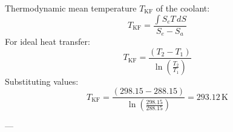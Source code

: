 Thermodynamic mean temperature \( T_{\text{KF}} \) of the coolant:  
\[
T_{\text{KF}} = \frac{\int S_e T \, dS}{S_e - S_a}
\]  
For ideal heat transfer:  
\[
T_{\text{KF}} = \frac{(T_2 - T_1)}{\ln \left( \frac{T_2}{T_1} \right)}
\]  
Substituting values:  
\[
T_{\text{KF}} = \frac{(298.15 - 288.15)}{\ln \left( \frac{298.15}{288.15} \right)} = 293.12 \, \text{K}
\]  

---